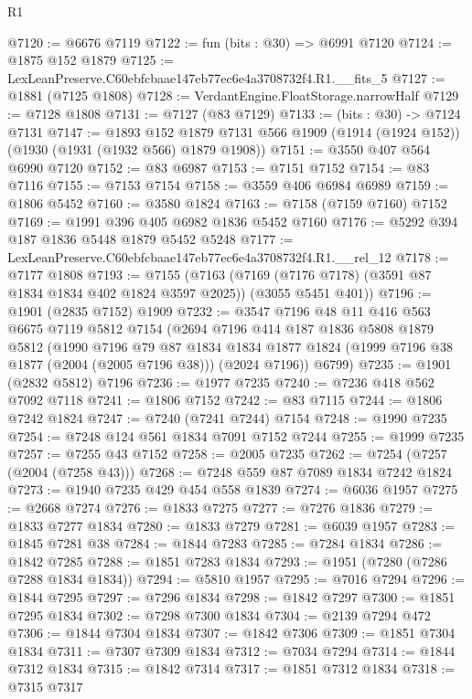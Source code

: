 \begin{lexlean}{R1}
\begin{coremodule}
@7120 := @6676 @7119
@7122 := fun (bits : @30) => @6991 @7120
@7124 := @1875 @152 @1879
@7125 := LexLeanPreserve.C60ebfcbaae147eb77ec6e4a3708732f4.R1.__fits_5
@7127 := @1881 (@7125 @1808)
@7128 := VerdantEngine.FloatStorage.narrowHalf
@7129 := @7128 @1808
@7131 := @7127 (@83 @7129)
@7133 := (bits : @30) -> @7124 @7131
@7147 := @1893
    @152
    @1879
    @7131
    @566
    @1909
    (@1914 (@1924 @152))
    (@1930 (@1931 (@1932 @566) @1879 @1908))
@7151 := @3550 @407 @564 @6990 @7120
@7152 := @83 @6987
@7153 := @7151 @7152
@7154 := @83 @7116
@7155 := @7153 @7154
@7158 := @3559 @406 @6984 @6989
@7159 := @1806 @5452
@7160 := @3580 @1824
@7163 := @7158 (@7159 @7160) @7152
@7169 := @1991 @396 @405 @6982 @1836 @5452 @7160
@7176 := @5292 @394 @187 @1836 @5448 @1879 @5452 @5248
@7177 := LexLeanPreserve.C60ebfcbaae147eb77ec6e4a3708732f4.R1.__rel_12
@7178 := @7177 @1808
@7193 := @7155
    (@7163 (@7169 (@7176 @7178) (@3591 @87 @1834 @1834 @402 @1824 @3597 @2025)) (@3055 @5451 @401))
@7196 := @1901 (@2835 @7152) @1909
@7232 := @3547
    @7196
    @48
    @11
    @416
    @563
    @6675
    @7119
    @5812
    @7154
    (@2694
      @7196
      @414
      @187
      @1836
      @5808
      @1879
      @5812
      (@1990
        @7196
        @79
        @87
        @1834
        @1834
        @1877
        @1824
        (@1999 @7196 @38 @1877 (@2004 (@2005 @7196 @38)))
        (@2024 @7196))
      @6799)
@7235 := @1901 (@2832 @5812) @7196
@7236 := @1977 @7235
@7240 := @7236 @418 @562 @7092 @7118
@7241 := @1806 @7152
@7242 := @83 @7115
@7244 := @1806 @7242 @1824
@7247 := @7240 (@7241 @7244) @7154
@7248 := @1990 @7235
@7254 := @7248 @124 @561 @1834 @7091 @7152 @7244
@7255 := @1999 @7235
@7257 := @7255 @43 @7152
@7258 := @2005 @7235
@7262 := @7254 (@7257 (@2004 (@7258 @43)))
@7268 := @7248 @559 @87 @7089 @1834 @7242 @1824
@7273 := @1940 @7235 @429 @454 @558 @1839
@7274 := @6036 @1957
@7275 := @2668 @7274
@7276 := @1833 @7275
@7277 := @7276 @1836
@7279 := @1833 @7277 @1834
@7280 := @1833 @7279
@7281 := @6039 @1957
@7283 := @1845 @7281 @38
@7284 := @1844 @7283
@7285 := @7284 @1834
@7286 := @1842 @7285
@7288 := @1851 @7283 @1834
@7293 := @1951 (@7280 (@7286 @7288 @1834 @1834))
@7294 := @5810 @1957
@7295 := @7016 @7294
@7296 := @1844 @7295
@7297 := @7296 @1834
@7298 := @1842 @7297
@7300 := @1851 @7295 @1834
@7302 := @7298 @7300 @1834
@7304 := @2139 @7294 @472
@7306 := @1844 @7304 @1834
@7307 := @1842 @7306
@7309 := @1851 @7304 @1834
@7311 := @7307 @7309 @1834
@7312 := @7034 @7294
@7314 := @1844 @7312 @1834
@7315 := @1842 @7314
@7317 := @1851 @7312 @1834
@7318 := @7315 @7317

\end{coremodule}
\end{lexlean}
